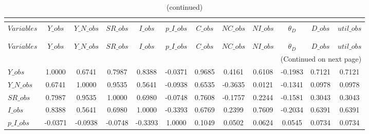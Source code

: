  
\begin{center}
\begin{longtable}{lccccccccccc} 
\caption{MATRIX OF CORRELATIONS}\\
 \label{Table:th_corr_matrix}\\
\toprule 
$Variables   $	 & 	 $       Y\_obs$	 & 	 $   Y\_N\_obs$	 & 	 $      SR\_obs$	 & 	 $       I\_obs$	 & 	 $   p\_I\_obs$	 & 	 $       C\_obs$	 & 	 $      NC\_obs$	 & 	 $      NI\_obs$	 & 	 $   {\theta_D}$	 & 	 $       D\_obs$	 & 	 $    util\_obs$\\
\midrule \endfirsthead 
\caption{(continued)}\\
 \toprule \\ 
$Variables   $	 & 	 $       Y\_obs$	 & 	 $   Y\_N\_obs$	 & 	 $      SR\_obs$	 & 	 $       I\_obs$	 & 	 $   p\_I\_obs$	 & 	 $       C\_obs$	 & 	 $      NC\_obs$	 & 	 $      NI\_obs$	 & 	 $   {\theta_D}$	 & 	 $       D\_obs$	 & 	 $    util\_obs$\\
\midrule \endhead 
\midrule \multicolumn{12}{r}{(Continued on next page)} \\ \bottomrule \endfoot 
\bottomrule \endlastfoot 
$Y\_obs      $	 & 	        1.0000	 & 	        0.6741	 & 	        0.7987	 & 	        0.8388	 & 	       -0.0371	 & 	        0.9685	 & 	        0.4161	 & 	        0.6108	 & 	       -0.1983	 & 	        0.7121	 & 	        0.7121 \\ 
$Y\_N\_obs   $	 & 	        0.6741	 & 	        1.0000	 & 	        0.9535	 & 	        0.5641	 & 	       -0.0938	 & 	        0.6535	 & 	       -0.3635	 & 	        0.0121	 & 	       -0.1341	 & 	        0.0978	 & 	        0.0978 \\ 
$SR\_obs     $	 & 	        0.7987	 & 	        0.9535	 & 	        1.0000	 & 	        0.6980	 & 	       -0.0748	 & 	        0.7608	 & 	       -0.1757	 & 	        0.2244	 & 	       -0.1581	 & 	        0.3043	 & 	        0.3043 \\ 
$I\_obs      $	 & 	        0.8388	 & 	        0.5641	 & 	        0.6980	 & 	        1.0000	 & 	       -0.3393	 & 	        0.6769	 & 	        0.2399	 & 	        0.7609	 & 	       -0.2034	 & 	        0.6391	 & 	        0.6391 \\ 
$p\_I\_obs   $	 & 	       -0.0371	 & 	       -0.0938	 & 	       -0.0748	 & 	       -0.3393	 & 	        1.0000	 & 	        0.1049	 & 	        0.0502	 & 	        0.0624	 & 	        0.0545	 & 	        0.0734	 & 	        0.0734 \\ 

\end{longtable}
\end{center}

